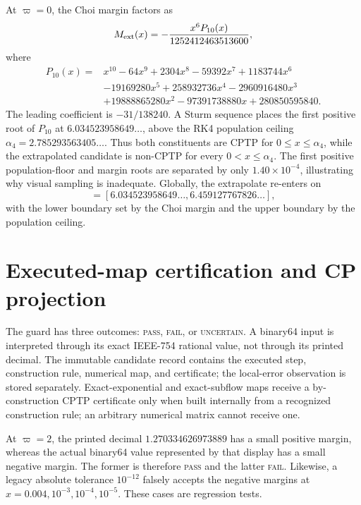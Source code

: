 \documentclass[11pt]{article}
\begin{document}
At $\varpi=0$, the Choi margin factors as
\begin{equation}
 M_{\rm ext}(x)=-\frac{x^6P_{10}(x)}{1252412463513600},
\end{equation}
where
\begin{align}
P_{10}(x)={}&x^{10}-64x^9+2304x^8-59392x^7+1183744x^6\\
&-19169280x^5+258932736x^4-2960916480x^3\\
&+19888865280x^2-97391738880x+280850595840.
\end{align}
The leading coefficient is $-31/138240$. A Sturm sequence places the first positive root of $P_{10}$ at $6.034523958649\ldots$, above the RK4 population ceiling $\alpha_4=2.785293563405\ldots$. Thus both constituents are CPTP for $0\le x\le\alpha_4$, while the extrapolated candidate is non-CPTP for every $0<x\le\alpha_4$. The first positive population-floor and margin roots are separated by only $1.40\times10^{-4}$, illustrating why visual sampling is inadequate. Globally, the extrapolate re-enters on
\begin{equation}
 [\rho_-,\rho_+]
 =[6.034523958649\ldots,6.459127767826\ldots],
\end{equation}
with the lower boundary set by the Choi margin and the upper boundary by the population ceiling.

\section{Executed-map certification and CP projection}
The guard has three outcomes: \textsc{pass}, \textsc{fail}, or \textsc{uncertain}. A binary64 input is interpreted through its exact IEEE-754 rational value, not through its printed decimal. The immutable candidate record contains the executed step, construction rule, numerical map, and certificate; the local-error observation is stored separately. Exact-exponential and exact-subflow maps receive a by-construction CPTP certificate only when built internally from a recognized construction rule; an arbitrary numerical matrix cannot receive one.

At $\varpi=2$, the printed decimal $1.270334626973889$ has a small positive margin, whereas the actual binary64 value represented by that display has a small negative margin. The former is therefore \textsc{pass} and the latter \textsc{fail}. Likewise, a legacy absolute tolerance $10^{-12}$ falsely accepts the negative margins at $x=0.004,10^{-3},10^{-4},10^{-5}$. These cases are regression tests.
\end{document}
